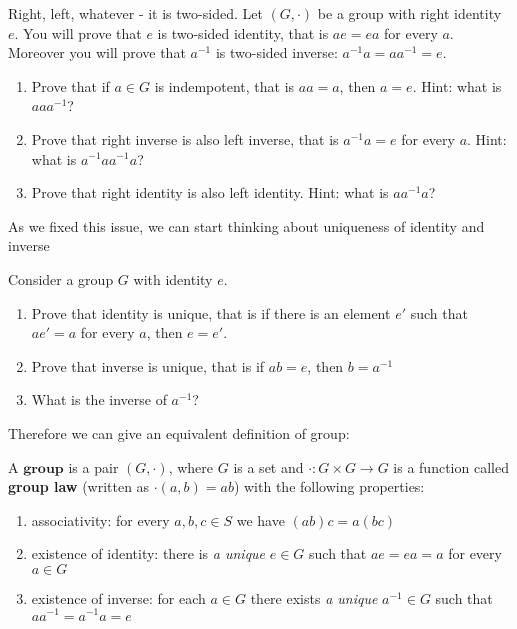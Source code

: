 \begin{exercise}
  Right, left, whatever - it is two-sided.
  Let $(G,\cdot)$ be a group with right identity $e$. You will prove that $e$ is two-sided identity, that is $ae=ea$ for every $a$. Moreover you will prove that $a^{-1}$ is two-sided inverse: $a^{-1}a=aa^{-1}=e$.
  \begin{enumerate}
    \item Prove that if $a\in G$ is indempotent, that is $aa=a$, then $a=e$. Hint: what is $aaa^{-1}$?
    \item Prove that right inverse is also left inverse, that is $a^{-1}a=e$ for every $a$. Hint: what is $a^{-1}aa^{-1}a$?
    \item Prove that right identity is also left identity. Hint: what is $aa^{-1}a$?
  \end{enumerate}
\end{exercise}

As we fixed this issue, we can start thinking about uniqueness of identity and inverse

\begin{exercise}
  Consider a group $G$ with identity $e$.
  \begin{enumerate}
    \item Prove that identity is unique, that is if there is an element $e'$ such that $ae'=a$ for every $a$, then $e=e'$.
    \item Prove that inverse is unique, that is if $ab=e$, then $b=a^{-1}$
    \item What is the inverse of $a^{-1}$?
  \end{enumerate}
\end{exercise}

Therefore we can give an equivalent definition of group:

\begin{definition}
  A $\textbf{group}$ is a pair $(G, \cdot)$, where $G$ is a set and $\cdot: G\times G\to G$ is a function called \textbf{group law} (written as $\cdot(a,b)=ab$) with the following properties:
  \begin{enumerate}
    \item associativity: for every $a,b,c\in S$ we have $(ab)c=a(bc)$
    \item existence of identity: there is \emph{a unique} $e\in G$ such that $ae=ea=a$ for every $a\in G$
    \item existence of inverse: for each $a\in G$ there exists \emph{a unique} $a^{-1}\in G$ such that $aa^{-1}=a^{-1}a=e$
  \end{enumerate}
\end{definition}

